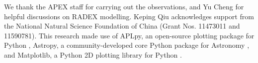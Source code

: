 \documentclass[twocolumn]{aastex62}
\begin{document}
\begin{CJK*}{UTF8}{gbsn}
\begin{abstract}
\end{abstract}








\acknowledgments
We thank the APEX staff for carrying out the observations, and Yu Cheng for helpful discussions on RADEX modelling. Keping Qiu acknowledges support from the National Natural Science Foundation of China (Grant Nos. 11473011 and 11590781). This research made use of APLpy, an open-source plotting package for Python \citep{2012ascl.soft08017R}, Astropy, a community-developed core Python package for Astronomy \citep{2013A&A...558A..33A}, and Matplotlib, a Python 2D plotting library for Python \citep{2007CSE.....9...90H}.




\end{CJK*}
\end{document}

